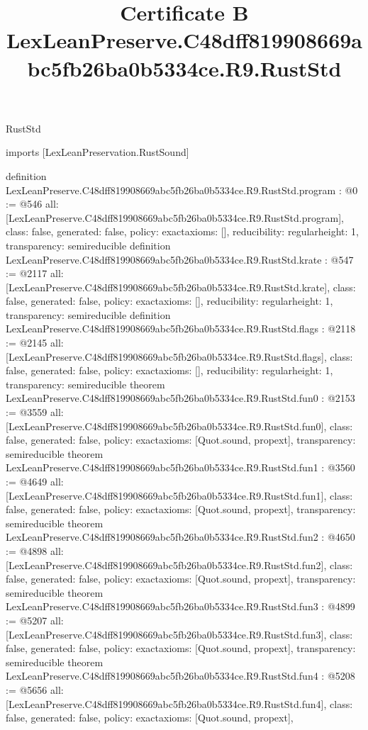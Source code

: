 \begin{lexlean}{RustStd}
\title{Certificate B LexLeanPreserve.C48dff819908669abc5fb26ba0b5334ce.R9.RustStd}
\begin{coremodule}
imports [LexLeanPreservation.RustSound]

definition LexLeanPreserve.C48dff819908669abc5fb26ba0b5334ce.R9.RustStd.program : @0 := @546 {
  all: [LexLeanPreserve.C48dff819908669abc5fb26ba0b5334ce.R9.RustStd.program],
  class: false,
  generated: false,
  policy: exact{axioms: []},
  reducibility: regular{height: 1},
  transparency: semireducible
}
definition LexLeanPreserve.C48dff819908669abc5fb26ba0b5334ce.R9.RustStd.krate : @547 := @2117 {
  all: [LexLeanPreserve.C48dff819908669abc5fb26ba0b5334ce.R9.RustStd.krate],
  class: false,
  generated: false,
  policy: exact{axioms: []},
  reducibility: regular{height: 1},
  transparency: semireducible
}
definition LexLeanPreserve.C48dff819908669abc5fb26ba0b5334ce.R9.RustStd.flags : @2118 := @2145 {
  all: [LexLeanPreserve.C48dff819908669abc5fb26ba0b5334ce.R9.RustStd.flags],
  class: false,
  generated: false,
  policy: exact{axioms: []},
  reducibility: regular{height: 1},
  transparency: semireducible
}
theorem LexLeanPreserve.C48dff819908669abc5fb26ba0b5334ce.R9.RustStd.fun0 : @2153 := @3559 {
  all: [LexLeanPreserve.C48dff819908669abc5fb26ba0b5334ce.R9.RustStd.fun0],
  class: false,
  generated: false,
  policy: exact{axioms: [Quot.sound, propext]},
  transparency: semireducible
}
theorem LexLeanPreserve.C48dff819908669abc5fb26ba0b5334ce.R9.RustStd.fun1 : @3560 := @4649 {
  all: [LexLeanPreserve.C48dff819908669abc5fb26ba0b5334ce.R9.RustStd.fun1],
  class: false,
  generated: false,
  policy: exact{axioms: [Quot.sound, propext]},
  transparency: semireducible
}
theorem LexLeanPreserve.C48dff819908669abc5fb26ba0b5334ce.R9.RustStd.fun2 : @4650 := @4898 {
  all: [LexLeanPreserve.C48dff819908669abc5fb26ba0b5334ce.R9.RustStd.fun2],
  class: false,
  generated: false,
  policy: exact{axioms: [Quot.sound, propext]},
  transparency: semireducible
}
theorem LexLeanPreserve.C48dff819908669abc5fb26ba0b5334ce.R9.RustStd.fun3 : @4899 := @5207 {
  all: [LexLeanPreserve.C48dff819908669abc5fb26ba0b5334ce.R9.RustStd.fun3],
  class: false,
  generated: false,
  policy: exact{axioms: [Quot.sound, propext]},
  transparency: semireducible
}
theorem LexLeanPreserve.C48dff819908669abc5fb26ba0b5334ce.R9.RustStd.fun4 : @5208 := @5656 {
  all: [LexLeanPreserve.C48dff819908669abc5fb26ba0b5334ce.R9.RustStd.fun4],
  class: false,
  generated: false,
  policy: exact{axioms: [Quot.sound, propext]},
}
\end{coremodule}
\end{lexlean}
